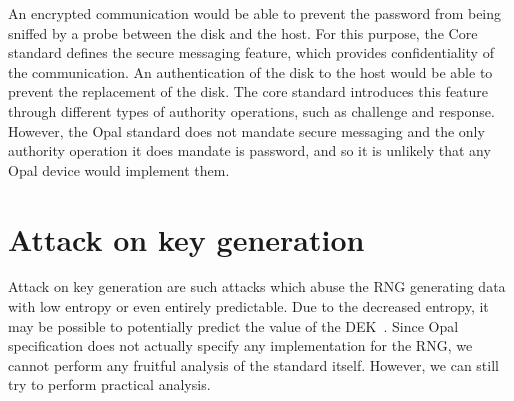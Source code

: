 An encrypted communication would be able to prevent the password from being sniffed by a probe between the disk and the host. For this purpose, the Core standard defines the secure messaging feature, which provides confidentiality of the communication.
An authentication of the disk to the host would be able to prevent the replacement of the disk. 
The core standard introduces this feature through different types of authority operations, such as challenge and response.
However, the Opal standard does not mandate secure messaging and the only authority operation it does mandate is password, and so it is unlikely that any Opal device would implement them.










\section{Attack on key generation}
\label{attack_rng}

Attack on key generation are such attacks which abuse the RNG generating data with low entropy or even entirely predictable. Due to the decreased entropy, it may be possible to potentially predict the value of the DEK~\cite{self_encrypting_deception}.
Since Opal specification does not actually specify any implementation for the RNG, we cannot perform any fruitful analysis of the standard itself. However, we can still try to perform practical analysis.



